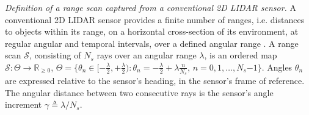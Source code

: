 \begin{definition}
  \label{def:definition_1}
  \textit{Definition of a range scan captured from a conventional 2D LIDAR
  sensor.} A conventional 2D LIDAR sensor provides a finite number of ranges,
  i.e. distances to objects within its range, on a horizontal cross-section of
  its environment, at regular angular and temporal intervals, over a defined
  angular range \cite{lidar}. A range scan $\mathcal{S}$, consisting
  of $N_s$ rays over an angular range $\lambda$, is an ordered map
  $\mathcal{S} : \Theta \rightarrow \mathbb{R}_{\geq 0}$, $\Theta =
  \{\theta_n \in [-\frac{\lambda}{2}, +\frac{\lambda}{2}) : \theta_n =
  -\frac{\lambda}{2} + \lambda \frac{n}{N_s}$, $n = 0,1,\dots, N_s$$-$$1$$\}$.
  Angles $\theta_n$ are expressed relative to the sensor's heading, in the
  sensor's frame of reference. The angular distance between two consecutive
  rays is the sensor's angle increment $\gamma \triangleq \lambda/N_s$.
\end{definition}



